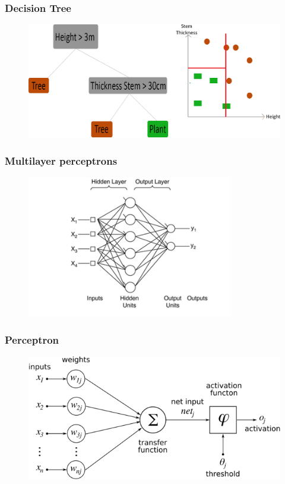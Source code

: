 \documentclass{beamer}
\begin{document}
\begin{frame}
\frametitle{Decision Tree}

	\begin{figure}
		\centering
   	 	\includegraphics[width=\textwidth,scale=1]{./img/DTExplained.png}
	\end{figure}

\end{frame}


\begin{frame}
\frametitle{Multilayer perceptrons}

	\begin{figure}
		\centering
    	\includegraphics[width=90mm,scale=1]{./img/MLP.jpg}
	\end{figure}

\end{frame}



\begin{frame} 
\frametitle{Perceptron}

	\begin{figure}
		\centering
    	\includegraphics[width=\textwidth]{./img/perceptron.png}
	\end{figure}

\end{frame}
\end{document}
